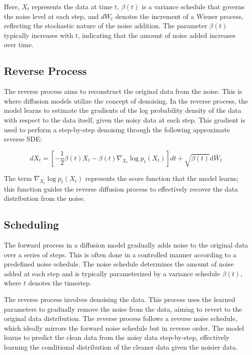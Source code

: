 Here, $X_t$ represents the data at time $t$, $\beta(t)$ is a variance schedule that governs the
noise level at each step, and $dW_t$ denotes the increment of a Wiener process, reflecting the
stochastic nature of the noise addition. The parameter $\beta(t)$ typically increases with $t$,
indicating that the amount of noise added increases over time.

\subsection{Reverse Process}

The reverse process aims to reconstruct the original data from the noise. This is where diffusion
models utilize the concept of denoising. In the reverse process, the model learns to estimate the
gradients of the log probability density of the data with respect to the data itself, given the
noisy data at each step. This gradient is used to perform a step-by-step denoising through the
following approximate reverse SDE:

\begin{equation}
    dX_t = \left[-\frac{1}{2}\beta(t)X_t - \beta(t)\nabla_{X_t}\log p_t(X_t)\right]dt + \sqrt{\beta(t)}\mathrm{d}\bar{W}_t
    \label{eq:reverse-sde}
\end{equation}

The term $\nabla_{X_t}\log p_t(X_t)$ represents the score function that the model learns; this
function guides the reverse diffusion process to effectively recover the data distribution from the
noise.

\subsection{Scheduling}

The forward process in a diffusion model gradually adds noise to the original data over a series of
steps. This is often done in a controlled manner according to a predefined noise schedule. The noise
schedule determines the amount of noise added at each step and is typically parameterized by a
variance schedule $\beta(t)$, where $t$ denotes the timestep.

The reverse process involves denoising the data. This process uses the learned parameters to
gradually remove the noise from the data, aiming to revert to the original data distribution. The
reverse process follows a reverse noise schedule, which ideally mirrors the forward noise schedule
but in reverse order. The model learns to predict the clean data from the noisy data step-by-step,
effectively learning the conditional distribution of the cleaner data given the noisier data.

